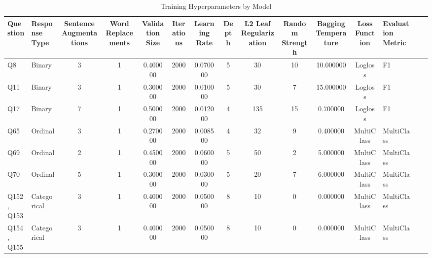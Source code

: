 \begin{table}
\caption{Training Hyperparameters by Model}
\label{tab:training_hyperparams_summary}
\begin{tabular}{llcccccccccclll}
\toprule
Question & Response Type & Sentence Augmentations & Word Replacements & Validation Size & Iterations & Learning Rate & Depth & L2 Leaf Regularization & Random Strength & Bagging Temperature & Loss Function & Evaluation Metric \\
\midrule
Q8 & Binary & 3 & 1 & 0.400000 & 2000 & 0.070000 & 5 & 30 & 10 & 10.000000 & Logloss & F1 \\
Q11 & Binary & 3 & 1 & 0.300000 & 2000 & 0.010000 & 5 & 30 & 7 & 15.000000 & Logloss & F1 \\
Q17 & Binary & 7 & 1 & 0.500000 & 2000 & 0.012000 & 4 & 135 & 15 & 0.700000 & Logloss & F1 \\
Q65 & Ordinal & 3 & 1 & 0.270000 & 2000 & 0.008500 & 4 & 32 & 9 & 0.400000 & MultiClass & MultiClass \\
Q69 & Ordinal & 2 & 1 & 0.450000 & 2000 & 0.060000 & 5 & 50 & 2 & 5.000000 & MultiClass & MultiClass \\
Q70 & Ordinal & 5 & 1 & 0.300000 & 2000 & 0.030000 & 5 & 20 & 7 & 6.000000 & MultiClass & MultiClass \\
Q152, Q153 & Categorical & 3 & 1 & 0.400000 & 2000 & 0.050000 & 8 & 10 & 0 & 0.000000 & MultiClass & MultiClass \\
Q154, Q155 & Categorical & 3 & 1 & 0.400000 & 2000 & 0.050000 & 8 & 10 & 0 & 0.000000 & MultiClass & MultiClass \\
\bottomrule
\end{tabular}
\end{table}
